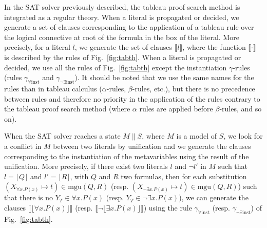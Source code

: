 In the SAT solver previously described, the tableau proof search method is
integrated as a regular theory. When a literal is propagated or decided, we
generate a set of clauses corresponding to the application of a tableau rule
over the logical connective at root of the formula in the box of the
literal. More precisely, for a literal $l$, we generate the set of clauses
$\llbracket{}l\rrbracket$, where the function $\llbracket\cdot\rrbracket$ is
described by the rules of Fig.~\ref{fig:tabth}. When a literal is propagated or
decided, we use all the rules of Fig.~\ref{fig:tabth} except the instantiation
$\gamma$-rules (rules $\gamma_{\forall\mathrm{inst}}$ and
$\gamma_{\neg\exists\mathrm{inst}}$). It should be noted that we use the same
names for the rules than in tableau calculus ($\alpha$-rules, $\beta$-rules,
etc.), but there is no precedence between rules and therefore no priority in the
application of the rules contrary to the tableau proof search method (where
$\alpha$ rules are applied before $\beta$-rules, and so on).

When the SAT solver reaches a state $M\parallel{}S$, where $M$ is a model of
$S$, we look for a conflict in $M$ between two literals by unification and we
generate the clauses corresponding to the instantiation of the metavariables
using the result of the unification. More precisely, if there exist two literals
$l$ and $\neg{}l'$ in $M$ such that $l=\lfloor{}Q\rfloor$ and
$l'=\lfloor{}R\rfloor$, with $Q$ and $R$ two formulas, then for each
substitution $(X_{\forall{}x.P(x)}\mapsto{}t)\in\mathrm{mgu}(Q,R)$ (resp.
$(X_{\neg\exists{}x.P(x)}\mapsto{}t)\in\mathrm{mgu}(Q,R)$) such that there is no
$Y_T\in\forall{}x.P(x)$ (resp. $Y_T\in\neg\exists{}x.P(x)$), we can generate the
clauses $\llbracket\lfloor\forall{}x.P(x)\rfloor{}\rrbracket$ 
(resp. $\llbracket\neg\lfloor\exists{}x.P(x)\rfloor{}\rrbracket$) using the rule
$\gamma_{\forall\mathrm{inst}}$ (resp. $\gamma_{\neg\exists\mathrm{inst}}$) of
Fig.~\ref{fig:tabth}.

